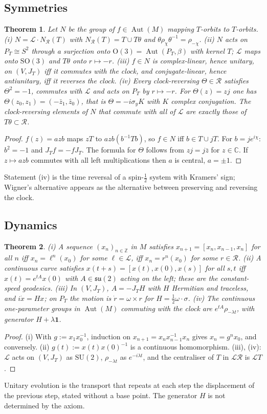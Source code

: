 \documentclass[aps,pra,onecolumn,superscriptaddress,nofootinbib,10pt]{revtex4-2}
\newtheorem{theorem}{Theorem}
\theoremstyle{definition}
\theoremstyle{remark}
\newcommand{\C}{\mathbb{C}}
\newcommand{\Z}{\mathbb{Z}}
\newcommand{\su}{\mathfrak{su}}
\newcommand{\cL}{\mathcal{L}}
\newcommand{\cR}{\mathcal{R}}
\newcommand{\Aut}{\operatorname{Aut}}
\newcommand{\hp}[3]{[#1,#2,#3]}
\newcommand{\SU}{\mathrm{SU}}
\newcommand{\SO}{\mathrm{SO}}
\newcommand{\OO}{\mathrm{O}}
\begin{document}
\subsection{Symmetries}
\begin{theorem}\label{thm:wigner}
Let $N$ be the group of $f\in\Aut(M)$ mapping $T$-orbits to $T$-orbits.
(i) $N=\cL\cdot N_\cR(T)$ with $N_\cR(T)=T\cup T\theta$ and $\theta\rho_\chi\theta^{-1}=\rho_{-\chi}$.
(ii) $N$ acts on $P_T\cong S^2$ through a surjection onto $\OO(3)=\Aut(P_T,\beta)$ with kernel $T$;
$\cL$ maps onto $\SO(3)$ and $T\theta$ onto $r\mapsto-r$.
(iii) $f\in N$ is complex-linear, hence unitary, on $(V,J_T)$ iff it commutes with the clock, and
conjugate-linear, hence antiunitary, iff it reverses the clock.
(iv) Every clock-reversing $\Theta\in\cR$ satisfies $\Theta^2=-1$, commutes with $\cL$ and acts on
$P_T$ by $r\mapsto-r$.  For $\Theta(z)=zj$ one has $\Theta(z_0,z_1)=(-\bar z_1,\bar z_0)$, that is
$\Theta=-i\sigma_yK$ with $K$ complex conjugation.  The clock-reversing elements of $N$ that commute with
all of $\cL$ are exactly those of $T\theta\subset\cR$.
\end{theorem}
\begin{proof}
$f(z)=azb$ maps $zT$ to $azb(b^{-1}Tb)$, so $f\in N$ iff $b\in T\cup jT$.  For $b=je^{i\chi}$:
$b^2=-1$ and $J_Tf=-fJ_T$.  The formula for $\Theta$ follows from $zj=j\bar z$ for $z\in\C$.  If
$z\mapsto azb$ commutes with all left multiplications then $a$ is central, $a=\pm1$.
\end{proof}
Statement (iv) is the time reversal of a spin-$\frac12$ system with Kramers' sign; Wigner's
alternative \cite{Wigner32,Bargmann} appears as the alternative between preserving and reversing the
clock.

\subsection{Dynamics}
\begin{theorem}\label{thm:dyn}
(i) A sequence $(x_n)_{n\in\Z}$ in $M$ satisfies $x_{n+1}=\hp{x_n}{x_{n-1}}{x_n}$ for all $n$ iff
$x_n=\ell^n(x_0)$ for some $\ell\in\cL$, iff $x_n=r^n(x_0)$ for some $r\in\cR$.
(ii) A continuous curve satisfies $x(t+s)=\hp{x(t)}{x(0)}{x(s)}$ for all $s,t$ iff $x(t)=e^{tA}x(0)$
with $A\in\su(2)$ acting on the left; these are the constant-speed geodesics.
(iii) In $(V,J_T)$, $A=-J_TH$ with $H$ Hermitian and traceless, and $i\dot x=Hx$; on $P_T$ the motion is
$\dot r=\omega\times r$ for $H=\tfrac12\omega\cdot\sigma$.
(iv) The continuous one-parameter groups in $\Aut(M)$ commuting with the clock are
$e^{tA}\rho_{-\lambda t}$, with generator $H+\lambda\mathbf 1$.
\end{theorem}
\begin{proof}
(i) With $g:=x_1x_0^{-1}$, induction on $x_{n+1}=x_nx_{n-1}^{-1}x_n$ gives $x_n=g^nx_0$, and conversely.
(ii) $g(t):=x(t)x(0)^{-1}$ is a continuous homomorphism.  (iii), (iv): $\cL$ acts on $(V,J_T)$ as
$\SU(2)$, $\rho_{-\lambda t}$ as $e^{-i\lambda t}$, and the centraliser of $T$ in $\cL\cR$ is $\cL T$.
\end{proof}
Unitary evolution is the transport that repeats at each step the displacement of the previous step,
stated without a base point.  The generator $H$ is not determined by the axiom.
\end{document}

